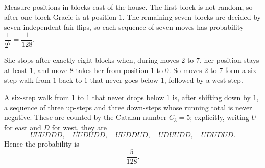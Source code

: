 Measure positions in blocks east of the house. The first block is not random, so after one block Gracie is at position $1$. The remaining seven blocks are decided by seven independent fair flips, so each sequence of seven moves has probability $\dfrac{1}{2^7}=\dfrac{1}{128}$.

She stops after exactly eight blocks when, during moves $2$ to $7$, her position stays at least $1$, and move $8$ takes her from position $1$ to $0$. So moves $2$ to $7$ form a six-step walk from $1$ back to $1$ that never goes below $1$, followed by a west step.

A six-step walk from $1$ to $1$ that never drops below $1$ is, after shifting down by $1$, a sequence of three up-steps and three down-steps whose running total is never negative. These are counted by the Catalan number $C_3=5$; explicitly, writing $U$ for east and $D$ for west, they are
\[UUUDDD,\quad UUDUDD,\quad UUDDUD,\quad UDUUDD,\quad UDUDUD.\]
Hence the probability is
\[\boxed{\dfrac{5}{128}}.\]
